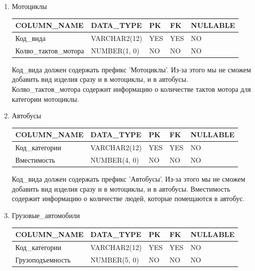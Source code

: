 \begin{enumerate}
\begin{tabular}{|p{7cm}|p{9.3cm}|}
    \end{tabular}

    \item{Мотоциклы}

    \begin{tabular}{|p{7cm}|p{3cm}|p{1cm}|p{1cm}|p{3cm}|} \hline

        {\bf COLUMN\_NAME} & {\bf DATA\_TYPE} & {\bf PK} & {\bf FK} & {\bf NULLABLE} \\ \hline
        Код\_вида & VARCHAR2(12) & YES & YES & NO \\ \hline
        Колво\_тактов\_мотора & NUMBER(1, 0) & NO & NO & NO \\ \hline

    \end{tabular}

    Код\_вида должен содержать префикс 'Мотоциклы'.
    Из-за этого мы не сможем добавить вид изделия сразу и в мотоциклы, и в автобусы.
    Колво\_тактов\_мотора содержит информацию о количестве тактов мотора для категории мотоциклы.

    \item{Автобусы}

    \begin{tabular}{|p{7cm}|p{3cm}|p{1cm}|p{1cm}|p{3cm}|} \hline

        {\bf COLUMN\_NAME} & {\bf DATA\_TYPE} & {\bf PK} & {\bf FK} & {\bf NULLABLE} \\ \hline
        Код\_категории & VARCHAR2(12) & YES & YES & NO \\ \hline
        Вместимость & NUMBER(4, 0) & NO & NO & NO \\ \hline

    \end{tabular}

    Код\_вида должен содержать префикс 'Автобусы'.
    Из-за этого мы не сможем добавить вид изделия сразу и в мотоциклы, и в автобусы.
    Вместимость содержит информацию о количестве людей, которые помещаются в автобус.

    \item{Грузовые\_автомобили}

    \begin{tabular}{|p{7cm}|p{3cm}|p{1cm}|p{1cm}|p{3cm}|} \hline

        {\bf COLUMN\_NAME} & {\bf DATA\_TYPE} & {\bf PK} & {\bf FK} & {\bf NULLABLE} \\ \hline
        Код\_категории & VARCHAR2(12) & YES & YES & NO \\ \hline
        Грузоподъемность & NUMBER(5, 0) & NO & NO & NO \\ \hline


\end{tabular}
\end{enumerate}
